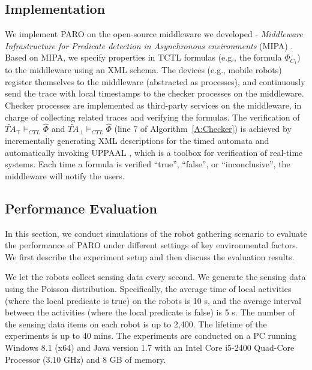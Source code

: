 \documentclass[10pt,conference,compsocconf,letterpaper]{IEEEtran}
\begin{document}
\subsection{Implementation}

We implement \textsf{PARO} on the open-source middleware we developed - {\it Middleware Infrastructure for Predicate detection in Asynchronous environments} (MIPA) \cite{MIPA}. Based on MIPA, we specify properties in TCTL formulas (e.g., the formula $\Phi_{C_1}$) to the middleware using an XML schema. The devices (e.g., mobile robots) register themselves to the middleware (abstracted as processes), and continuously send the trace with local timestamps to the checker processes on the middleware. Checker processes are implemented as third-party services on the middleware, in charge of collecting related traces and verifying the formulas. The verification of $\widetilde{TA}_\top \models_{CTL} \hat{\Phi}$ and $\widetilde{TA}_\bot \models_{CTL} \hat{\Phi}$ (line 7 of Algorithm~\ref{A:Checker}) is achieved by incrementally generating XML descriptions for the timed automata and automatically invoking UPPAAL \cite{Behrmann04}, which is a toolbox for verification of real-time systems. Each time a formula is verified ``true'', ``false'', or ``inconclusive'', the middleware will notify the users.

\subsection{Performance Evaluation}\label{sec:Performance Evaluation}

In this section, we conduct simulations of the robot gathering scenario to evaluate the performance of \textsf{PARO} under different settings of key environmental factors. We first describe the experiment setup and then discuss the evaluation results.

We let the robots collect sensing data every second. We generate the sensing data using the Poisson distribution. Specifically, the average time of local activities (where the local predicate is true) on the robots is 10 s, and the average interval between the activities (where the local predicate is false) is 5 s. The number of the sensing data items on each robot is up to 2,400. The lifetime of the experiments is up to 40 mins. The experiments are conducted on a PC running Windows 8.1 (x64) and Java version 1.7 with an Intel Core i5-2400 Quad-Core Processor (3.10 GHz) and 8 GB of memory.
\end{document}
